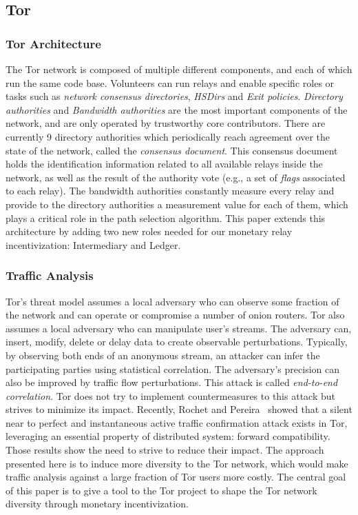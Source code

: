 \subsection{Tor}

\subsubsection{Tor Architecture}
The Tor network is composed of multiple different components, and each of which
run the same code base. Volunteers can run relays and enable specific roles or
tasks such as \textit{network consensus directories}, \textit{HSDirs} and
\textit{Exit policies}. \textit{Directory authorities} and \textit{Bandwidth
  authorities} are the most important components of the network, and are only
operated by trustworthy core contributors. There are currently 9 directory
authorities which periodically reach agreement over the state of the network,
called the \textit{consensus document}. This consensus document holds the
identification information related to all available relays inside the network,
as well as the result of the authority vote (e.g., a set of \textit{flags}
associated to each relay). The bandwidth authorities constantly measure every
relay and provide to the directory authorities a measurement value for each of
them, which plays a critical role in the path selection algorithm. This paper
extends this architecture by adding two new roles needed for our monetary relay
incentivization: Intermediary and Ledger.

\subsubsection{Traffic Analysis}
Tor's threat model assumes a local adversary who can observe some fraction of
the network and can operate or compromise a number of onion routers. Tor also
assumes a local adversary who can manipulate user's streams. The adversary can,
insert, modify, delete or delay data to create observable
perturbations. Typically, by observing both ends of an anonymous stream, an
attacker can infer the participating parties using statistical correlation. The
adversary's precision can also be improved by traffic flow perturbations. This
attack is called \textit{end-to-end correlation}. Tor does not try to implement
countermeasures to this attack but strives to minimize its impact. Recently,
Rochet and Pereira~\cite{popets-dropping} showed that a silent near to perfect
and instantaneous active traffic confirmation attack exists in Tor, leveraging
an essential property of distributed system: forward compatibility. Those
results show the need to strive to reduce their impact. The approach presented
here is to induce more diversity to the Tor network, which would make traffic
analysis against a large fraction of Tor users more costly. The central goal of
this paper is to give a tool to the Tor project to shape the Tor network
diversity through monetary incentivization.

